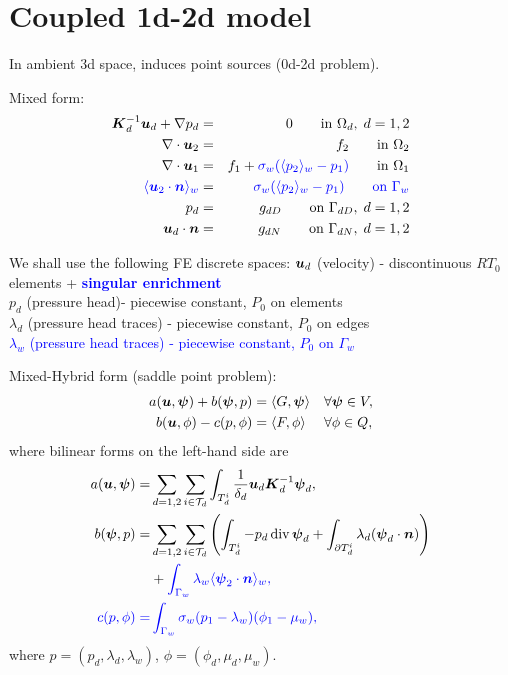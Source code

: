 

\usepackage{enumitem}



\section{Coupled 1d-2d model}

In ambient 3d space, induces point sources (0d-2d problem).
  
  Mixed form:
  \begin{eqnarray}
\mathbf{\boldsymbol{K}}_d^{-1}\mathbf{\boldsymbol{u}}_d + \nabla p_d &=& 0 \qquad \textrm{in } \Omega_d,\; d=1,2  \\
\nabla \cdot \mathbf{\boldsymbol{u}}_2 &=& f_2 \qquad \textrm{in } \Omega_2\\
\nabla \cdot \mathbf{\boldsymbol{u}}_1 &=& f_1 + {\color{blue}\sigma_w(\langle p_2\rangle_w-p_1)}\qquad \textrm{in } \Omega_1\\
\color{blue}\langle\mathbf{\boldsymbol{u}}_2 \cdot \mathbf{\boldsymbol{n}}\rangle_w &=& \color{blue}\sigma_w (\langle p_2\rangle_w - p_{1}) \qquad \textrm{on } \Gamma_w\\
p_d &=& g_{dD} \qquad \textrm{on } \Gamma_{dD},\; d=1,2 \\
\mathbf{\boldsymbol{u}}_d \cdot \mathbf{\boldsymbol{n}} &=& g_{dN} \qquad \textrm{on } \Gamma_{dN},\; d=1,2
  \end{eqnarray}
  
  
  We shall use the following FE discrete spaces:
  $\mathbf{\boldsymbol{u}}_d$ (velocity) - discontinuous $RT_0$ elements + \textcolor{blue}{\bf singular enrichment}\\
  $p_d$ (pressure head)- piecewise constant, $P_0$ on elements \\
  $\lambda_d$ (pressure head traces) - piecewise constant, $P_0$ on edges \\
  \textcolor{blue}{$\lambda_w$ (pressure head traces) - piecewise constant, $P_0$ on $\Gamma_w$}
  
  
  Mixed-Hybrid form (saddle point problem): 
\begin{align}
        \label{Saddle1}
 a(\mathbf{\boldsymbol{u}},\mathbf{\boldsymbol{\psi}}) + b(\mathbf{\boldsymbol{\psi}}, p) &= \langle G, \mathbf{\boldsymbol{\psi}}\rangle &&\forall 
\mathbf{\boldsymbol{\psi}}\in V,\\
        \label{Saddle2}
 b(\mathbf{\boldsymbol{u}}, \phi) - c(p,\phi) &= \langle F, \phi \rangle &&\forall \phi \in Q,
\end{align}
where bilinear forms on the left-hand side are
\begin{align*}
 a(\vc u, \vc \psi)=&\sum_{d=1,2}\sum_{i\in \mathcal T_d} \int_{T_d^i}
   \frac{1}{\delta_d} \vc u_d \vc K_d^{-1} \vc \psi_d,\\
%
 b(\vc \psi, p)=&\sum_{d=1,2}\sum_{i\in \mathcal T_d} 
        \left(
        \int_{T_d^i} -p_d\, \div\,\vc \psi_d
        +\int_{\prtl T_d^i}
                 \lambda_d (\vc \psi_d \cdot \vc n)
        \right) \\
        &+\color{blue}{\int_{\Gamma_w}
                 \lambda_w \avg{\vc \psi_2 \cdot \vc n}_w},\\
%
\color{blue}
 c(p,\phi) =& \color{blue}
          \int_{\Gamma_w}
               \sigma_w(p_{1}-\lambda_w)(\phi_{1}-\mu_w),
\end{align*}
where $p=(p_d,\lambda_d, \lambda_w)$, $\phi=(\phi_d,\mu_d, \mu_w)$.

